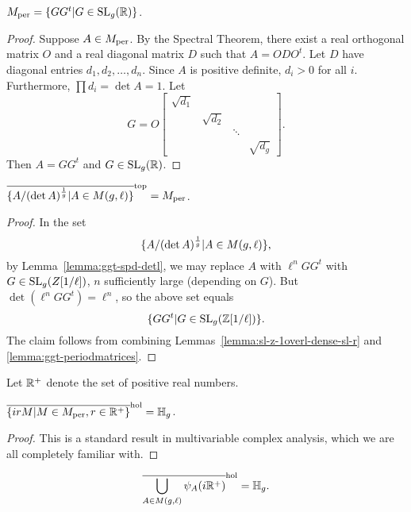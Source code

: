 \documentclass{amsart}
\begin{document}
\begin{lemma}\label{lemma:ggt-periodmatrices}
  $M_{\textrm{per}} = \{GG^t | G \in \operatorname{SL}_g(\mathbb{R})\}$.
\end{lemma}

\begin{proof}
  Suppose $A \in M_{\textrm{per}}$. By the Spectral Theorem, there exist a real orthogonal matrix $O$ and a real diagonal matrix $D$ such that $A = ODO^t$. Let $D$ have diagonal entries $d_1, d_2, \dots, d_n$. Since $A$ is positive definite, $d_i > 0$ for all $i$. Furthermore, $\prod d_i = \det A = 1$. Let
  \[
    G = O
    \begin{bmatrix}
      \sqrt{d_1} & & & \\
      & \sqrt{d_2} & & \\
      & & \ddots & \\
      & & & \sqrt{d_{g}}
    \end{bmatrix}.
\]
Then $A = GG^t$ and $G \in \operatorname{SL}_g(\mathbb{R})$.
\end{proof}

\begin{proposition}\label{prop:A-over-detA}
  $\overline{\{A/(\det A)^{\frac{1}{g}} | A \in M(g,\ell)\}}^\mathrm{top} = M_{\textrm{per}}$.
\end{proposition}

\begin{proof}
  In the set
  \[
    \{A/(\det A)^{\frac{1}{g}} | A \in M(g,\ell)\},
  \]
  by Lemma~\ref{lemma:ggt-spd-detl}, we may replace $A$ with $\ell^n GG^t$ with $G \in \operatorname{SL}_g(Z[1/\ell])$, $n$ sufficiently large (depending on $G$). But $\det (\ell^n GG^t) = \ell^n$, so the above set equals
  \[
    \{GG^t | G \in \operatorname{SL}_g(\mathbb{Z}[1/\ell])\}.
  \]
  The claim follows from combining Lemmas~\ref{lemma:sl-z-1overl-dense-sl-r} and \ref{lemma:ggt-periodmatrices}.
\end{proof}

Let $\mathbb{R}^+$ denote the set of positive real numbers.
\begin{lemma}\label{lemma:holomorphic-closure-irM}
  $\overline{\{ irM | M \in M_{\textrm{per}}, r \in \mathbb{R}^+\}}^\mathrm{hol} = \mathbb{H}_g$.
\end{lemma}

\begin{proof}
  This is a standard result in multivariable complex analysis, which we are all completely familiar with.
\end{proof}

\begin{lemma}
  \[
    \overline{\bigcup_{A \in M(g,\ell)} \psi_A(i\mathbb{R}^+)}^\mathrm{hol} = \mathbb{H}_g.
  \]
\end{lemma}
\end{document}
